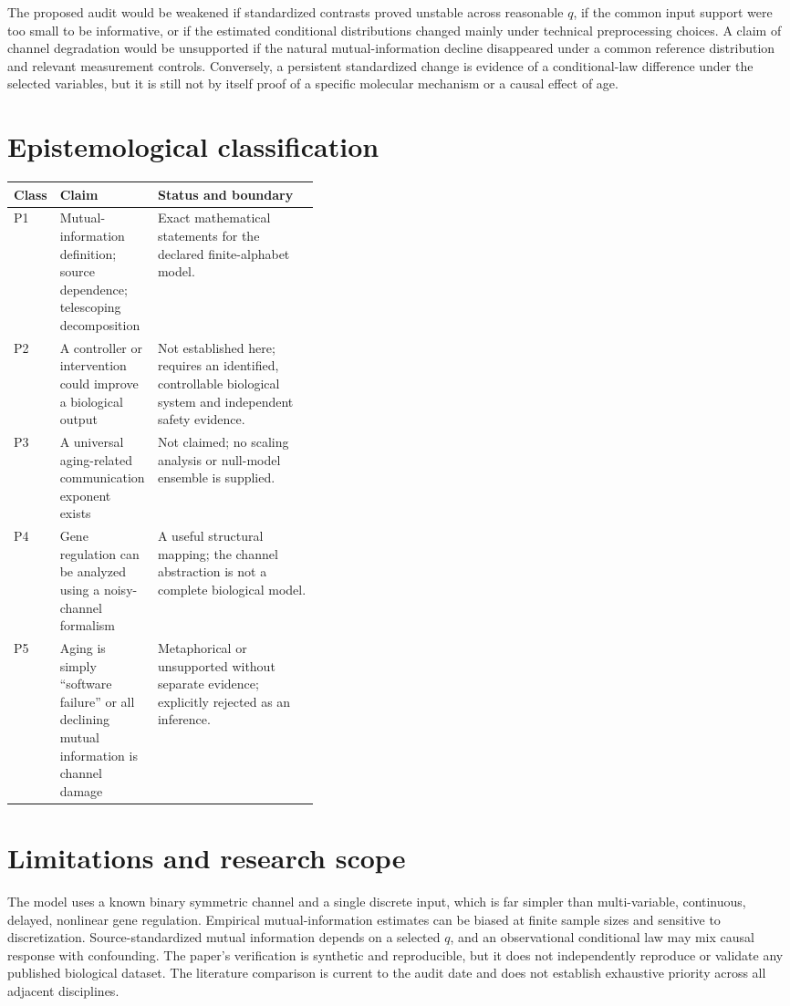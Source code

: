 \documentclass[11pt]{article}
\begin{document}
The proposed audit would be weakened if standardized contrasts proved unstable across reasonable $q$, if the common input support were too small to be informative, or if the estimated conditional distributions changed mainly under technical preprocessing choices. A claim of channel degradation would be unsupported if the natural mutual-information decline disappeared under a common reference distribution and relevant measurement controls. Conversely, a persistent standardized change is evidence of a conditional-law difference under the selected variables, but it is still not by itself proof of a specific molecular mechanism or a causal effect of age.

\section{Epistemological classification}
\begin{center}\small
\begin{tabularx}{\linewidth}{@{}p{0.07\linewidth}p{0.32\linewidth}X@{}}\toprule
Class & Claim & Status and boundary \\\midrule
P1 & Mutual-information definition; source dependence; telescoping decomposition & Exact mathematical statements for the declared finite-alphabet model. \\
P2 & A controller or intervention could improve a biological output & Not established here; requires an identified, controllable biological system and independent safety evidence. \\
P3 & A universal aging-related communication exponent exists & Not claimed; no scaling analysis or null-model ensemble is supplied. \\
P4 & Gene regulation can be analyzed using a noisy-channel formalism & A useful structural mapping; the channel abstraction is not a complete biological model. \\
P5 & Aging is simply “software failure” or all declining mutual information is channel damage & Metaphorical or unsupported without separate evidence; explicitly rejected as an inference. \\\bottomrule
\end{tabularx}
\end{center}

\section{Limitations and research scope}
The model uses a known binary symmetric channel and a single discrete input, which is far simpler than multi-variable, continuous, delayed, nonlinear gene regulation. Empirical mutual-information estimates can be biased at finite sample sizes and sensitive to discretization. Source-standardized mutual information depends on a selected $q$, and an observational conditional law may mix causal response with confounding. The paper's verification is synthetic and reproducible, but it does not independently reproduce or validate any published biological dataset. The literature comparison is current to the audit date and does not establish exhaustive priority across all adjacent disciplines.
\end{document}
